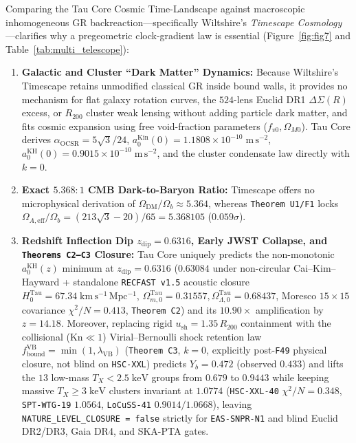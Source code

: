 \documentclass[11pt,a4paper]{article}
\begin{document}
Comparing the Tau Core Cosmic Time-Landscape against macroscopic inhomogeneous GR backreaction---specifically Wiltshire's \emph{Timescape Cosmology} \cite{Wiltshire2007Timescape}---clarifies why a pregeometric clock-gradient law is essential (Figure~\ref{fig:fig7} and Table~\ref{tab:multi_telescope}):
\begin{enumerate}
  \item \textbf{Galactic and Cluster ``Dark Matter'' Dynamics:} Because Wiltshire's Timescape retains unmodified classical GR inside bound walls, it provides no mechanism for flat galaxy rotation curves, the $524$-lens Euclid DR1 $\Delta\Sigma(R)$ excess, or $R_{200}$ cluster weak lensing without adding particle dark matter, and fits cosmic expansion using free void-fraction parameters ($f_{v0}, \Omega_{M0}$). Tau Core derives $\alpha_{\mathrm{OCSR}} = 5\sqrt{3}/24$, $a_0^{\mathrm{Kin}}(0) = 1.1808\times 10^{-10}\;\mathrm{m\,s^{-2}}$, $a_0^{\mathrm{KH}}(0) = 0.9015\times 10^{-10}\;\mathrm{m\,s^{-2}}$, and the cluster condensate law directly with $k = 0$.
  \item \textbf{Exact $5.368:1$ CMB Dark-to-Baryon Ratio:} Timescape offers no microphysical derivation of $\Omega_{\mathrm{DM}}/\Omega_b \approx 5.364$, whereas \texttt{Theorem U1/F1} locks $\Omega_{A,\mathrm{eff}}/\Omega_b = (213\sqrt{3}-20)/65 = 5.368105$ ($0.059\sigma$).
  \item \textbf{Redshift Inflection Dip $z_{\mathrm{dip}} = 0.6316$, Early JWST Collapse, and \texttt{Theorems C2--C3} Closure:} Tau Core uniquely predicts the non-monotonic $a_0^{\mathrm{KH}}(z)$ minimum at $z_{\mathrm{dip}} = 0.6316$ ($0.63084$ under non-circular Cai--Kim--Hayward + standalone \texttt{RECFAST v1.5} acoustic closure $H_0^{\mathrm{Tau}} = 67.34\;\mathrm{km\,s^{-1}\,Mpc^{-1}}$, $\Omega_{m,0}^{\mathrm{Tau}} = 0.31557, \Omega_{\Lambda,0}^{\mathrm{Tau}} = 0.68437$, Moresco $15\times 15$ covariance $\chi^2/N = 0.413$, \texttt{Theorem~C2}) and its $10.90\times$ amplification by $z = 14.18$. Moreover, replacing rigid $u_{\mathrm{sh}} = 1.35\,R_{200}$ containment with the collisional ($\mathrm{Kn} \ll 1$) Virial--Bernoulli shock retention law $f_{\mathrm{bound}}^{\mathrm{VB}} = \min(1, \lambda_{\mathrm{VB}})$ (\texttt{Theorem~C3}, $k = 0$, explicitly post-\texttt{F49} physical closure, not blind on \texttt{HSC-XXL}) predicts $Y_b = 0.472$ (observed $0.433$) and lifts the $13$ low-mass $T_X < 2.5\;\mathrm{keV}$ groups from $0.679$ to $\mathbf{0.9443}$ while keeping massive $T_X \ge 3\;\mathrm{keV}$ clusters invariant at $\mathbf{1.0774}$ (\texttt{HSC-XXL-40} $\chi^2/N = \mathbf{0.348}$, \texttt{SPT-WTG-19} $1.0564$, \texttt{LoCuSS-41} $0.9014/1.0668$), leaving \texttt{NATURE\_LEVEL\_CLOSURE = false} strictly for \texttt{EAS-SNPR-N1} and blind Euclid DR2/DR3, Gaia DR4, and SKA-PTA gates.
\end{enumerate}
\end{document}
